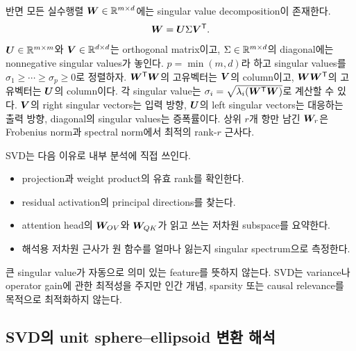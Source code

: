 반면 모든 실수행렬 $\bm{W}\in\mathbb{R}^{m\times d}$에는 singular value decomposition이 존재한다.
\begin{equation}
  \bm{W}=\bm{U}\Sigma\bm{V}^{\mathsf T}.
\end{equation}
$\bm{U}\in\mathbb{R}^{m\times m}$와 $\bm{V}\in\mathbb{R}^{d\times d}$는 orthogonal matrix이고, $\Sigma\in\mathbb{R}^{m\times d}$의 diagonal에는 nonnegative singular values가 놓인다.
$p=\min(m,d)$라 하고 singular values를 $\sigma_1\geq\cdots\geq\sigma_p\geq0$로 정렬하자.
$\bm{W}^{\mathsf T}\bm{W}$의 고유벡터는 $\bm{V}$의 column이고, $\bm{W}\bm{W}^{\mathsf T}$의 고유벡터는 $\bm{U}$의 column이다.
각 singular value는 $\sigma_i=\sqrt{\lambda_i(\bm{W}^{\mathsf T}\bm{W})}$로 계산할 수 있다.
$\bm{V}$의 right singular vectors는 입력 방향, $\bm{U}$의 left singular vectors는 대응하는 출력 방향, diagonal의 singular values는 증폭률이다.
상위 $r$개 항만 남긴 $\bm{W}_r$은 Frobenius norm과 spectral norm에서 최적의 rank-$r$ 근사다.

SVD는 다음 이유로 내부 분석에 직접 쓰인다.

\begin{itemize}
  \item projection과 weight product의 유효 rank를 확인한다.
  \item residual activation의 principal directions를 찾는다.
  \item attention head의 $\bm{W}_{OV}$와 $\bm{W}_{QK}$가 읽고 쓰는 저차원 subspace를 요약한다.
  \item 해석용 저차원 근사가 원 함수를 얼마나 잃는지 singular spectrum으로 측정한다.
\end{itemize}

\begin{limitbox}
큰 singular value가 자동으로 의미 있는 feature를 뜻하지 않는다.
SVD는 variance나 operator gain에 관한 최적성을 주지만 인간 개념, sparsity 또는 causal relevance를 목적으로 최적화하지 않는다.
\end{limitbox}

\subsection{SVD의 unit sphere--ellipsoid 변환 해석}

